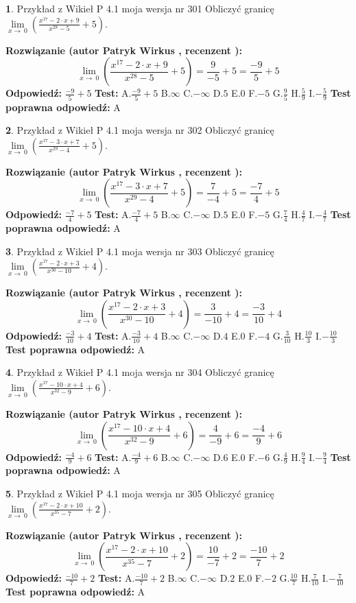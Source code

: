 \documentclass[12pt, a4paper]{article}
\theoremstyle{definition} %
\newtheorem{zad}{}
\newcommand{\zadStart}[1]{\begin{zad}#1\newline}
\newcommand{\zadStop}{\end{zad}}
\newcommand{\rozwStart}[2]{\noindent \textbf{Rozwiązanie (autor #1 , recenzent #2): }\newline}
\newcommand{\rozwStop}{\newline}
\newcommand{\odpStart}{\noindent \textbf{Odpowiedź:}\newline}
\newcommand{\odpStop}{\newline}
\newcommand{\testStart}{\noindent \textbf{Test:}\newline}
\newcommand{\testStop}{\newline}
\newcommand{\kluczStart}{\noindent \textbf{Test poprawna odpowiedź:}\newline}
\newcommand{\kluczStop}{\newline}
\begin{document}
\zadStart{Przykład z Wikieł P 4.1 moja wersja nr 301}
Obliczyć granicę $\lim\limits_{x\to\ 0}(\frac{x^{17}-2 \cdot x +9}{x^{28}-5}+5)$.
\zadStop
\rozwStart{Patryk Wirkus}{}
$$\lim\limits_{x\to\ 0}(\frac{x^{17}-2 \cdot x +9}{x^{28}-5}+5)=\frac{9}{-5}+5=\frac{-9}{5}+5$$
\rozwStop
\odpStart
$\frac{-9}{5}+5$
\odpStop
\testStart
A.$\frac{-9}{5}+5$
B.$\infty$
C.$-\infty$
D.$5$
E.$0$
F.$-5$
G.$\frac{9}{5}$
H.$\frac{5}{9}$
I.$-\frac{5}{9}$
\testStop
\kluczStart
A
\kluczStop



\zadStart{Przykład z Wikieł P 4.1 moja wersja nr 302}
Obliczyć granicę $\lim\limits_{x\to\ 0}(\frac{x^{17}-3 \cdot x +7}{x^{29}-4}+5)$.
\zadStop
\rozwStart{Patryk Wirkus}{}
$$\lim\limits_{x\to\ 0}(\frac{x^{17}-3 \cdot x +7}{x^{29}-4}+5)=\frac{7}{-4}+5=\frac{-7}{4}+5$$
\rozwStop
\odpStart
$\frac{-7}{4}+5$
\odpStop
\testStart
A.$\frac{-7}{4}+5$
B.$\infty$
C.$-\infty$
D.$5$
E.$0$
F.$-5$
G.$\frac{7}{4}$
H.$\frac{4}{7}$
I.$-\frac{4}{7}$
\testStop
\kluczStart
A
\kluczStop



\zadStart{Przykład z Wikieł P 4.1 moja wersja nr 303}
Obliczyć granicę $\lim\limits_{x\to\ 0}(\frac{x^{17}-2 \cdot x +3}{x^{30}-10}+4)$.
\zadStop
\rozwStart{Patryk Wirkus}{}
$$\lim\limits_{x\to\ 0}(\frac{x^{17}-2 \cdot x +3}{x^{30}-10}+4)=\frac{3}{-10}+4=\frac{-3}{10}+4$$
\rozwStop
\odpStart
$\frac{-3}{10}+4$
\odpStop
\testStart
A.$\frac{-3}{10}+4$
B.$\infty$
C.$-\infty$
D.$4$
E.$0$
F.$-4$
G.$\frac{3}{10}$
H.$\frac{10}{3}$
I.$-\frac{10}{3}$
\testStop
\kluczStart
A
\kluczStop



\zadStart{Przykład z Wikieł P 4.1 moja wersja nr 304}
Obliczyć granicę $\lim\limits_{x\to\ 0}(\frac{x^{17}-10 \cdot x +4}{x^{32}-9}+6)$.
\zadStop
\rozwStart{Patryk Wirkus}{}
$$\lim\limits_{x\to\ 0}(\frac{x^{17}-10 \cdot x +4}{x^{32}-9}+6)=\frac{4}{-9}+6=\frac{-4}{9}+6$$
\rozwStop
\odpStart
$\frac{-4}{9}+6$
\odpStop
\testStart
A.$\frac{-4}{9}+6$
B.$\infty$
C.$-\infty$
D.$6$
E.$0$
F.$-6$
G.$\frac{4}{9}$
H.$\frac{9}{4}$
I.$-\frac{9}{4}$
\testStop
\kluczStart
A
\kluczStop



\zadStart{Przykład z Wikieł P 4.1 moja wersja nr 305}
Obliczyć granicę $\lim\limits_{x\to\ 0}(\frac{x^{17}-2 \cdot x +10}{x^{35}-7}+2)$.
\zadStop
\rozwStart{Patryk Wirkus}{}
$$\lim\limits_{x\to\ 0}(\frac{x^{17}-2 \cdot x +10}{x^{35}-7}+2)=\frac{10}{-7}+2=\frac{-10}{7}+2$$
\rozwStop
\odpStart
$\frac{-10}{7}+2$
\odpStop
\testStart
A.$\frac{-10}{7}+2$
B.$\infty$
C.$-\infty$
D.$2$
E.$0$
F.$-2$
G.$\frac{10}{7}$
H.$\frac{7}{10}$
I.$-\frac{7}{10}$
\testStop
\kluczStart
A
\kluczStop
\end{document}

